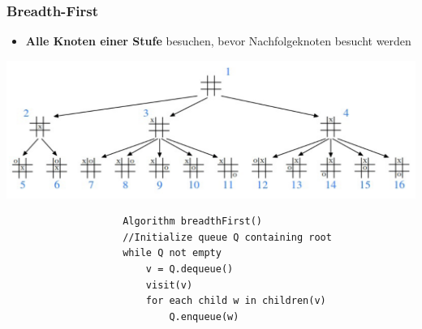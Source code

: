 \documentclass[a4paper, landscape, 8pt]{scrartcl}
\begin{document}
\begin{multicols*}{4}
                \subsubsection{Breadth-First}
                    \begin{itemize}
                        \item {\bfseries Alle Knoten einer Stufe} besuchen, bevor Nachfolgeknoten besucht werden
                    \end{itemize}
                    \includegraphics[scale=0.14]{graphic/12_baum_traversierung_breadth-first}
                    \begin{lstlisting}
                    Algorithm breadthFirst()
                    //Initialize queue Q containing root
                    while Q not empty
                        v = Q.dequeue()
                        visit(v)
                        for each child w in children(v)
                            Q.enqueue(w)
                    \end{lstlisting}
        

\end{multicols*}
\end{document}
